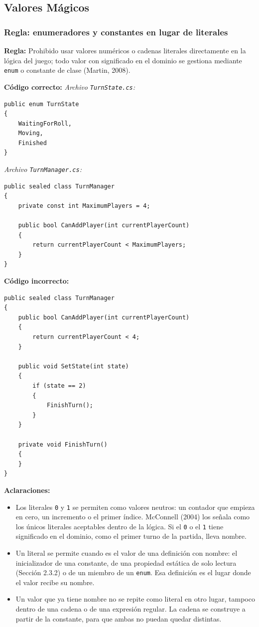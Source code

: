 \subsection{Valores Mágicos}

\subsubsection{Regla: enumeradores y constantes en lugar de literales}

\textbf{Regla:} Prohibido usar valores numéricos o cadenas literales directamente en la lógica del juego; todo valor con significado en el dominio se gestiona mediante \texttt{enum} o constante de clase (Martin, 2008).

\textbf{Código correcto:}
\textit{Archivo \texttt{TurnState.cs}:}
\begin{lstlisting}[style=csharpstyle]
public enum TurnState
{
    WaitingForRoll,
    Moving,
    Finished
}
\end{lstlisting}

\textit{Archivo \texttt{TurnManager.cs}:}
\begin{lstlisting}[style=csharpstyle]
public sealed class TurnManager
{
    private const int MaximumPlayers = 4;

    public bool CanAddPlayer(int currentPlayerCount)
    {
        return currentPlayerCount < MaximumPlayers;
    }
}
\end{lstlisting}

\textbf{Código incorrecto:}
\begin{lstlisting}[style=csharpstyle]
public sealed class TurnManager
{
    public bool CanAddPlayer(int currentPlayerCount)
    {
        return currentPlayerCount < 4;
    }

    public void SetState(int state)
    {
        if (state == 2)
        {
            FinishTurn();
        }
    }

    private void FinishTurn()
    {
    }
}
\end{lstlisting}

\textbf{Aclaraciones:}
\begin{itemize}
    \item Los literales \texttt{0} y \texttt{1} se permiten como valores neutros: un contador que empieza en cero, un incremento o el primer índice. McConnell (2004) los señala como los únicos literales aceptables dentro de la lógica. Si el \texttt{0} o el \texttt{1} tiene significado en el dominio, como el primer turno de la partida, lleva nombre.
    \item Un literal se permite cuando es el valor de una definición con nombre: el inicializador de una constante, de una propiedad estática de solo lectura (Sección 2.3.2) o de un miembro de un \texttt{enum}. Esa definición es el lugar donde el valor recibe su nombre.
    \item Un valor que ya tiene nombre no se repite como literal en otro lugar, tampoco dentro de una cadena o de una expresión regular. La cadena se construye a partir de la constante, para que ambas no puedan quedar distintas.
\end{itemize}

